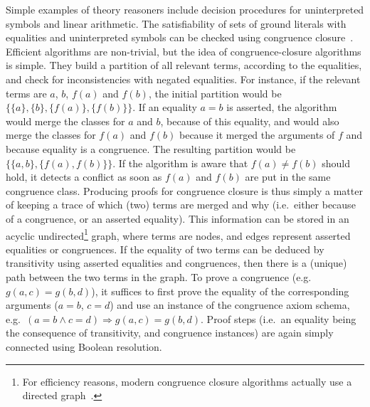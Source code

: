 \documentclass{llncs}
\begin{document}
Simple examples of theory reasoners include decision procedures for
uninterpreted symbols and linear arithmetic.
The satisfiability of sets of ground literals with equalities and uninterpreted
symbols can be checked using congruence
closure~\cite{Nelson2,Nieuwenhuis3,Nieuwenhuis6}.  Efficient algorithms are
non-trivial, but the idea of congruence-closure algorithms is simple.  They
build a 
partition of all relevant terms, according to the equalities, and check for
inconsistencies with negated equalities.  For instance, if the relevant terms
are $a$, $b$, $f(a)$ and $f(b)$, the initial partition would be $\big\{\{a\},
\{b\}, \{f(a)\}, \{f(b)\}\big\}$.  If an equality $a=b$ is asserted, the
algorithm would merge the classes for $a$ and $b$, because of this equality, and
would also merge the classes for $f(a)$ and $f(b)$ because it merged the
arguments of $f$ and because equality is a congruence.  The resulting partition would be $\big\{\{a, b\}, \{f(a), f(b)\}\big\}$.  If the algorithm is
aware that $f(a) \neq f(b)$ should hold, it detects a conflict as soon as $f(a)$
and $f(b)$ are put in the same congruence class.  Producing proofs for congruence
closure is thus simply a matter of keeping a trace of which (two) terms are merged
and why (i.e.\ either because of a congruence, or an asserted equality).  This
information can be stored in an acyclic undirected\footnote{For efficiency
  reasons, modern congruence closure algorithms actually use a directed
  graph~\cite{Nieuwenhuis6}.} graph, where terms are nodes, and edges represent
asserted equalities or congruences.  If the equality of two terms can be deduced
by transitivity using asserted equalities and congruences, then there is a
(unique) path between the two terms in the graph.  To prove a congruence
(e.g.\ $g(a,c) = g(b,d)$), it suffices to first prove the equality of the
corresponding arguments ($a=b$, $c=d$) and use an instance of the congruence
axiom schema, e.g.\ $(a=b \wedge c=d) \Rightarrow g(a,c) = g(b,d)$.  Proof
steps (i.e.\ an equality being the consequence of transitivity, and congruence
instances) are again simply connected using Boolean resolution.
\end{document}
